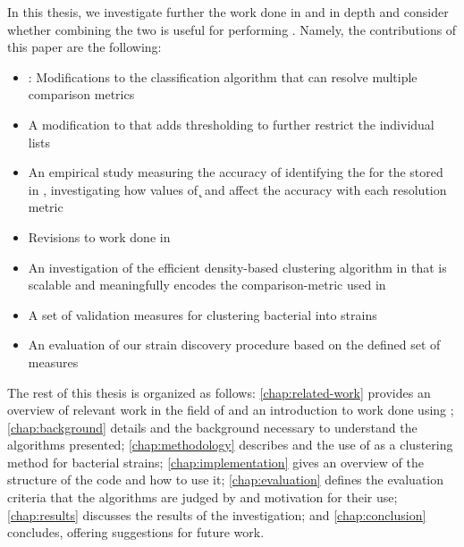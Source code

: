 In this thesis, we investigate further the work done in \cite{DBLP:conf/bibm/McGovernDKBVG15} and \cite{DBLP:conf/bcb/McGovernJDBKV16} in depth and consider whether combining the two is useful for performing \mst{}.
Namely, the contributions of this paper are the following:
\begin{itemize}
    \item \krapmed{}: Modifications to the \kNN{} classification algorithm that can resolve multiple comparison metrics
    \item A modification to \kNN{} that adds \a{} thresholding to further restrict the individual \kNN{} lists
    \item An empirical study measuring the accuracy of identifying the \spec{} for the \ecoli{} \isols{} stored in \cplop{}, investigating how values of \k{} and \a{} affect the accuracy with each resolution metric
    \item Revisions to work done in \cite{DBLP:conf/bibm/McGovernDKBVG15}
    \item An investigation of the efficient density-based clustering algorithm in \cite{johnson2015density} that is scalable and meaningfully encodes the comparison-metric used in \cplop{}
    \item A set of validation measures for clustering bacterial \isols{} into strains
    \item An evaluation of our strain discovery procedure based on the defined set of measures
\end{itemize}

The rest of this thesis is organized as follows:
\autoref{chap:related-work} provides an overview of relevant work in the field of \mst{} and an introduction to work done using \cplop{};
\autoref{chap:background} details \cplop{} and the background necessary to understand the algorithms presented;
\autoref{chap:methodology} describes \krap{} and the use of \dbscan{} as a clustering method for bacterial strains;
\autoref{chap:implementation} gives an overview of the structure of the code and how to use it;
\autoref{chap:evaluation} defines the evaluation criteria that the algorithms are judged by and motivation for their use;
\autoref{chap:results} discusses the results of the investigation;
and
\autoref{chap:conclusion} concludes, offering suggestions for future work.